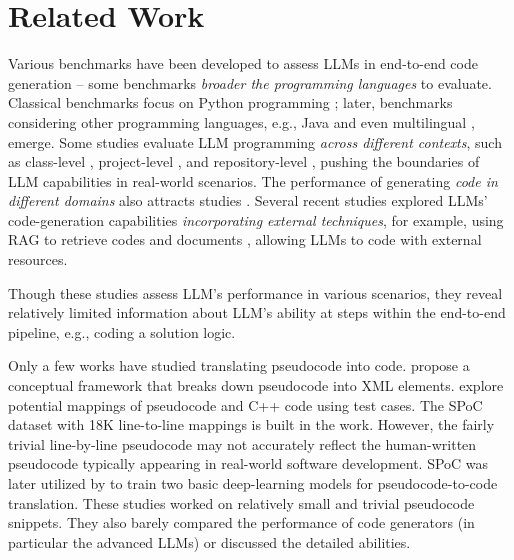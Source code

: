\section{Related Work}\label{sec:related-work}


Various benchmarks have been developed to assess LLMs in end-to-end code generation -- %
some benchmarks {\textit{broader the programming languages}} to evaluate. Classical benchmarks focus on Python programming \cite{humaneval, mbpp}; later, benchmarks considering other programming languages, e.g., Java \cite{JavaBench} and even multilingual \cite{humanevalx}, emerge. %
Some studies evaluate LLM programming {\textit{across different contexts}}, %
such as class-level \cite{classeval}, project-level \cite{deveval}, and repository-level \cite{repocoder, repoeval}, pushing the boundaries of LLM capabilities in real-world scenarios.
The performance of generating \textit{{code in different domains}} also attracts studies \cite{domaineval}. %
Several recent studies explored LLMs' code-generation capabilities {\textit{incorporating external techniques}}, for example, using RAG to retrieve codes \cite{ase24retrieval_repo, codesearchallyouneed_hu} and documents \cite{docragarxiv, docragccwan}, allowing LLMs to code with external resources.

Though these studies assess LLM's performance in various scenarios, they reveal relatively limited information about LLM's ability at steps within the end-to-end pipeline, e.g., coding a solution logic.

Only a few works have studied translating pseudocode into code. \citet{Dir17} propose a conceptual framework that breaks down pseudocode into XML elements. \citet{Kul19} explore potential mappings of pseudocode and C++ code using test cases. The SPoC dataset with 18K line-to-line mappings is built in the work. However, the fairly trivial line-by-line pseudocode may not accurately reflect the human-written pseudocode typically appearing in real-world software development. SPoC was later utilized by \citet{Ach22} to train two basic deep-learning models for pseudocode-to-code translation.
These studies worked on relatively small and trivial pseudocode snippets. They also barely compared the performance of code generators (in particular the advanced LLMs) or discussed the detailed abilities. %




